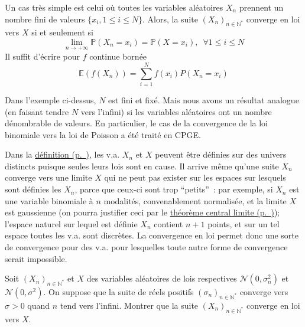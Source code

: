 \begin{exemple}\label{IV-cas-fini}

Un cas très simple est celui où toutes les variables aléatoires \(X_n\)
prennent un nombre fini de valeurs \(\{ x_i , 1 \leq i \leq N \}\).
Alors, la suite \((X_n)_{n \in \mathbb{N}^\ast}\) converge en loi vers
\(X\) si et seulement si
\[\lim_{n \to +\infty} \mathbb{P}(X_n = x_i ) = \mathbb{P}(X = x_i),\,\,\, \forall 1 \leq i \leq N\]
Il suffit d'écrire pour \(f\) continue bornée
\[ \mathbb{E}(f (X_n)) = \sum_{i=1}^N f (x_i ) P(X_n = x_i) \]

Dans l'exemple ci-dessus, \(N\) est fini et fixé. Mais nous avons un
résultat analogue (en faisant tendre \(N\) vers l'infini) si les
variables aléatoires ont un nombre dénombrable de valeurs. En
particulier, le cas de la convergence de la loi binomiale vers la loi de
Poisson a été traité en CPGE.

\end{exemple}



\begin{remarque}\label{IV-univers-de-duxe9finition}
Dans la \protect\hyperref[IV-defconvloi]{définition (p.~\pageref*{IV-defconvloi})},
les v.a. \(X_n\) et \(X\) peuvent être définies sur des univers
distincts puisque seules leurs lois sont en cause. Il arrive même qu'une
suite \(X_n\) converge vers une limite \(X\) qui ne peut pas exister sur
les espaces sur lesquels sont définies les \(X_n\), parce que ceux-ci
sont trop ``petits''~: par exemple, si \(X_n\) est une variable
binomiale à \(n\) modalités, convenablement normalisée, et la limite
\(X\) est gaussienne (on pourra justifier ceci par le
\protect\hyperref[IV-TCL]{théorème central
limite (p.~\pageref*{IV-TCL})}); l'espace naturel sur lequel est définie
\(X_n\) contient \(n+1\) points, et sur un tel espace toutes les v.a.
sont discrètes. La convergence en loi permet donc une sorte de
convergence pour des v.a. pour lesquelles toute autre forme de
convergence serait impossible.
\end{remarque}

\label{IV-suitegauss}
Soit \((X_n)_{n \in \mathbb{N}^\ast}\) et \(X\) des variables aléatoires
de lois respectives \(\mathcal{N}(0,\sigma^2_n)\) et
\(\mathcal{N}(0,\sigma^2)\). On suppose que la suite de réels positifs
\((\sigma_n)_{n\in \mathbb{N}^\ast}\) converge vers \(\sigma > 0\) quand
\(n\) tend vers l'infini. Montrer que la suite
\((X_n)_{n \in \mathbb{N}^\ast}\) converge en loi vers
\(X\).

